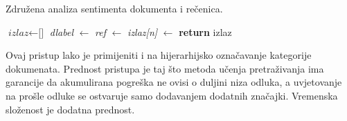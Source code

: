 \begin{algorithm}
\caption{Združena analiza sentimenta dokumenta i rečenica.}
\label{alg:sentiment:docsent}
\begin{algorithmic}[1]
\State $\textit{izlaz} \gets \text{[]}$
\State \textit{dlabel} $\gets$ 
\State {} 
  \State \textit{ref} $\gets$ 
  \State \textit{izlaz[n]} $\gets$ 
\EndFor
\State {}
\State \textbf{return} izlaz
\EndFunction
\end{algorithmic}
\end{algorithm}

Ovaj pristup lako je primijeniti i na hijerarhijsko označavanje kategorije
dokumenata. Prednost pristupa je taj što metoda učenja pretraživanja ima
garancije da akumulirana pogreška ne ovisi o duljini niza odluka, a uvjetovanje
na prošle odluke se ostvaruje samo dodavanjem dodatnih značajki. Vremenska
složenost je dodatna prednost.

